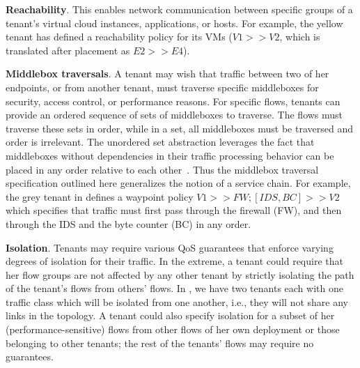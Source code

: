 \begin{compactitemize}
\item \textbf{Reachability}. This enables network communication
  between specific groups of a tenant's virtual cloud instances,
  applications, or hosts. For example, the yellow tenant has defined a reachability
  policy for its VMs ($V1 >> V2$, which is translated  after 
  placement as $E2 >> E4$).
\item \textbf{Middlebox traversals}. A tenant may wish that traffic
  between two of her endpoints, or from another tenant, must traverse
   specific middleboxes %
   for
  security, access control, or performance reasons. For specific
  flows, tenants can provide
  an ordered sequence of sets of middleboxes
  to traverse. The flows must traverse these sets in order,
  while in a set, all middleboxes must be traversed
  and order is irrelevant.  The
  unordered set abstraction leverages the fact that middleboxes
  without dependencies in their traffic processing behavior can be
  placed in any order relative to each other~\cite{pga}. Thus the
  middlebox traversal specification outlined here generalizes the
  notion of a service chain. For example, the grey tenant in 
  defines a waypoint policy $V1 >> FW; [IDS,BC] >> V2$
   which specifies that traffic must first pass through the firewall (FW),
  and then through the IDS and the byte counter (BC) in any order. 


\item \textbf{Isolation}. Tenants may require various QoS guarantees
  that enforce varying degrees of isolation for their traffic. In the
  extreme, a tenant could require that her flow groups are not affected
  by any other tenant by strictly isolating the path of the tenant's
  flows from others' flows. In , we have two tenants
  each with one traffic class which will be isolated from one another, i.e.,
  they will not share any links in the topology. 
  A tenant could also specify isolation for a subset of her
  (performance-sensitive) flows from other flows of her own deployment
  or those belonging to other tenants; the rest of the tenants' flows
  may require no guarantees.


\end{compactitemize}
